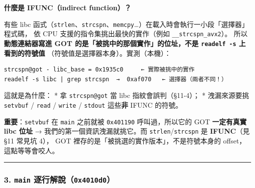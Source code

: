 \documentclass[10pt,a4paper]{article}
\renewenvironment{quote}{%
  \begin{mdframed}[linewidth=0pt,innerleftmargin=0pt,innerrightmargin=0pt,
    innerbottommargin=0pt,innertopmargin=0pt,skipabove=0.55em,skipbelow=0.55em,
    leftmargin=0.9em,rightmargin=0.4em,startcode={\color{quotebar}\vrule width 2.6pt},%
    endcode={}]%
  \itshape\color{black}%
}{%
  \end{mdframed}%
}
\begin{document}
\textbf{什麼是 IFUNC（indirect function）？}

有些 libc
函式（\texttt{strlen}、\texttt{strcspn}、\texttt{memcpy}\ldots）在載入時會執行一小段「選擇器」程式碼，
依 CPU 支援的指令集挑出最快的實作（例如 \texttt{\_\allowbreak{}\_\allowbreak{}strcspn\_\allowbreak{}avx2}）。
所以\textbf{動態連結器寫進 GOT 的是「被挑中的那個實作」的位址，不是
\texttt{readelf\ \allowbreak{}-\allowbreak{}s} 上看到的符號值}
（符號值是選擇器本身）。實測（本機）：

\begin{Verbatim}[breaklines=true,breakanywhere=true,breakautoindent=false,fontsize=\fontsize{7.0}{9.5}\selectfont]
strcspn@got - libc_base = 0x1935c0     ← 實際被挑中的實作
readelf -s libc | grep strcspn  →  0xaf070   ← 選擇器（兩者不同！）
\end{Verbatim}

這就是為什麼： * 拿 \texttt{strcspn@got} 當 libc 指紋會誤判（§11-4）； *
洩漏來源要挑 \texttt{setvbuf} / \texttt{read} / \texttt{write} /
\texttt{stdout} 這些\textbf{非} IFUNC 的符號。

\begin{quote}
\textbf{重要}：\texttt{setvbuf} 在 \texttt{main} 之前就被
\texttt{0x401190} 呼叫過，所以它的 GOT \textbf{一定有真實 libc 位址} →
我們的第一個資訊洩漏就挑它。而 \texttt{strlen}/\texttt{strcspn} 是
\textbf{IFUNC}（見 §11 常見坑 4）， GOT
裡存的是「被挑選的實作版本」，不是符號本身的 offset，這點等等會咬人。
\end{quote}

\begin{center}\rule{0.5\linewidth}{0.5pt}\end{center}

\subsubsection{\texorpdfstring{3. \texttt{main}
逐行解說（\texttt{0x4010d0}）}{3. main 逐行解說（0x4010d0）}}\label{main-ux9010ux884cux89e3ux8aaa0x4010d0}
\end{document}
